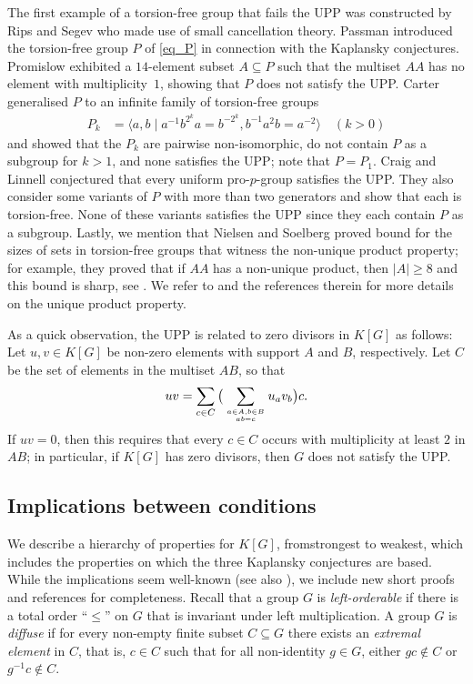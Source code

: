 \documentclass[11pt]{amsart}
\theoremstyle{mythm}
\theoremstyle{mydef}
\theoremstyle{myrem}
\numberwithin{equation}{section}
\renewcommand{\leq}{\leqslant}
\renewcommand{\geq}{\geqslant}
\begin{document}
 The first example of a torsion-free group that fails  the UPP was constructed by Rips and Segev \cite{RS} who made use of small cancellation theory. Passman introduced the torsion-free group $P$ of \eqref{eq_P} in connection with the Kaplansky conjectures.  Promislow \cite{P} exhibited a $14$-element subset $A\subseteq P$ such that the multiset $AA$ has no element with multiplicity~$1$, showing that $P$ does not satisfy the UPP. Carter \cite{C} generalised $P$ to an infinite family of torsion-free groups
\begin{align}\label{eq_Pk} 
	P_k &= \langle a,b \mid a^{-1}b^{2^k}a = b^{-2^k}, b^{-1}a^2b=a^{-2} \rangle\quad(k>0)
\end{align}
and showed that the $P_k$ are pairwise non-isomorphic, do not contain $P$ as a subgroup for $k>1$, and none satisfies the UPP; note that $P=P_1$. Craig and Linnell \cite{CL} conjectured that every uniform pro-$p$-group satisfies the UPP. They also consider some variants of $P$ with more than two generators and show that each is torsion-free. None of these variants satisfies the UPP since they each contain $P$ as a subgroup. Lastly, we mention that Nielsen and Soelberg proved bound for the sizes of sets in torsion-free groups that witness the non-unique product property; for example, they proved that if $AA$ has a non-unique product, then $|A|\geq 8$ and this bound is sharp, see \cite[Theorem~1.2]{nielsen}.
  We refer to \cite{CL} and the references therein for more details on the unique product property. 
  
  
  As a quick observation, the  UPP   is related to  zero divisors in $K[G]$ as follows: Let $u,v\in K[G]$ be non-zero elements with support $A$ and $B$, respectively. Let $C$ be the set of elements in the multiset $AB$, so that 
  \[uv=\sum_{c\in C} \big(\sum_{a\in A, b\in B\atop ab=c} u_av_b\big) c.\]
  If $uv=0$, then this requires that every $c\in C$ occurs with multiplicity at least $2$ in $AB$; in particular, if $K[G]$ has zero divisors, then $G$ does not satisfy the UPP. 
  
  
 \subsection{Implications between conditions}

We  describe a hierarchy of properties for $K[G]$, from\linebreak strongest to weakest,  which includes the properties on which  the three Kaplansky conjectures are based. While the  implications seem well-known (see also \cite{bowditch,blog}),   we include new short proofs and references for completeness. Recall that a group $G$ is \emph{left-orderable} if there is a total order ``$\leq$'' on $G$ that is invariant under left multiplication. A group  $G$ is \emph{diffuse} \cite{bowditch} if for every non-empty finite subset $C\subseteq G$ there exists an \emph{extremal element} in $C$, that is, $c\in C$ such that for all non-identity $g\in G$, either $gc \notin C$ or $g^{-1} c\notin C$. 
\end{document}

